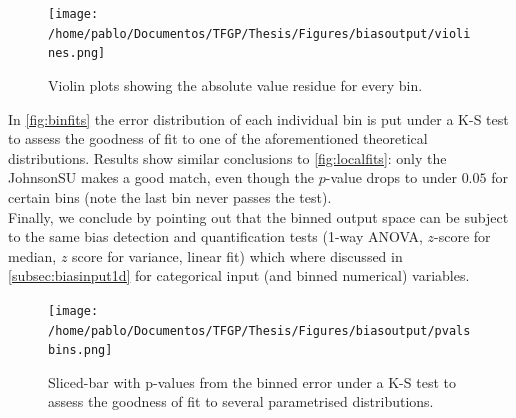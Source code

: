 %
\begin{figure}[!htb]
	\centering
	\texttt{[image: /home/pablo/Documentos/TFGP/Thesis/Figures/biasoutput/violines.png]}
	\caption{Violin plots showing the absolute value residue for every bin.}
	\label{fig:violins}
\end{figure}
%
\indent In \autoref{fig:binfits} the error distribution of each individual bin is put under a K-S test to assess the goodness of fit to one of the aforementioned theoretical distributions. Results show similar conclusions to \autoref{fig:localfits}: only the JohnsonSU makes a good match, even though the $p$-value drops to under $0.05$ for certain bins (note the last bin never passes the test).\\
%
\indent Finally, we conclude by pointing out that the binned output space can be subject to the same bias detection and quantification tests (1-way ANOVA, $z$-score for median, $z$ score for variance, linear fit) which where discussed in \autoref{subsec:biasinput1d} for categorical input (and binned numerical) variables.\\

\begin{figure}[!htb]
	\centering
	\texttt{[image: /home/pablo/Documentos/TFGP/Thesis/Figures/biasoutput/pvalsbins.png]}
	\caption{Sliced-bar with p-values from the binned error under a K-S test to assess the goodness of fit to several parametrised distributions.}
	\label{fig:binfits}
\end{figure}

\clearpage
